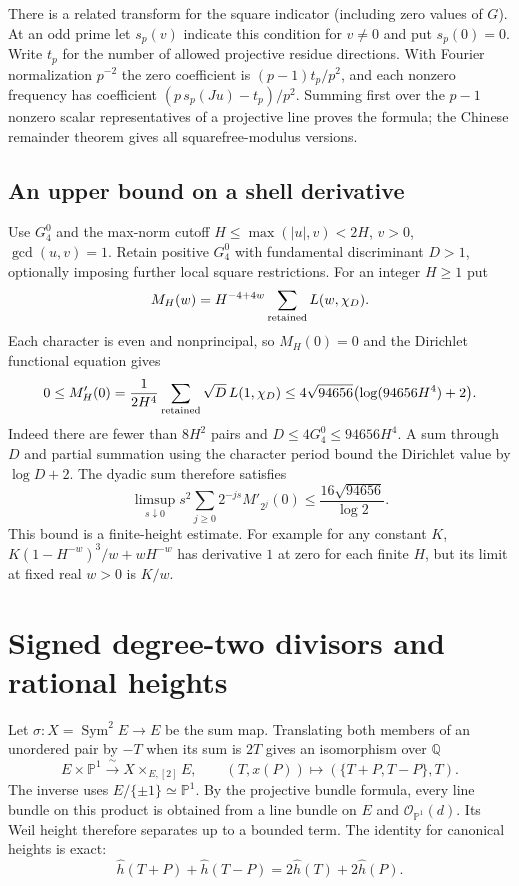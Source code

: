 \documentclass[11pt]{article}
\newcommand{\Q}{\mathbb{Q}}
\begin{document}
There is a related transform for the square indicator (including
zero values of $G$). At an odd prime let $s_p(v)$ indicate this
condition for $v\ne0$ and put $s_p(0)=0$. Write $t_p$ for the number
of allowed projective residue directions. With Fourier normalization
$p^{-2}$ the zero coefficient is $(p-1)t_p/p^2$, and each nonzero
frequency has coefficient $(p\,s_p(Ju)-t_p)/p^2$. Summing first
over the $p-1$ nonzero scalar representatives of a projective line
proves the formula; the Chinese remainder theorem gives all
squarefree-modulus versions.

\subsection{An upper bound on a shell derivative}
Use $G^0_4$ and the max-norm cutoff
$H\le\max(|u|,v)<2H$, $v>0$, $\gcd(u,v)=1$. Retain positive
$G^0_4$ with fundamental discriminant $D>1$, optionally imposing
further local square restrictions. For an integer $H\ge1$ put
\[
 M_H(w)=H^{-4+4w}\sum_{\rm retained}L(w,\chi_D).
\]
Each character is even and nonprincipal, so $M_H(0)=0$ and the
Dirichlet functional equation gives
\[
 0\le M'_H(0)=\frac1{2H^4}\sum_{\rm retained}\sqrt D\,L(1,\chi_D)
 \le4\sqrt{94656}\bigl(\log(94656H^4)+2\bigr).
\]
Indeed there are fewer than $8H^2$ pairs and
$D\le4G_4^0\le94656H^4$. A sum through $D$ and partial summation
using the character period bound the Dirichlet value by $\log D+2$.
The dyadic sum therefore satisfies
\[
 \limsup_{s\downarrow0}s^2\sum_{j\ge0}2^{-js}M'_{2^j}(0)
 \le\frac{16\sqrt{94656}}{\log2}.
\]
This bound is a finite-height estimate. For example for any constant
$K$, $K(1-H^{-w})^3/w+wH^{-w}$ has derivative $1$ at zero for each
finite $H$, but its limit at fixed real $w>0$ is $K/w$.

\section{Signed degree-two divisors and rational heights}
Let $\sigma:X=\operatorname{Sym}^2 E\to E$ be the sum map. Translating
both members of an unordered pair by $-T$ when its sum is $2T$ gives
an isomorphism over $\Q$
\[
 E\times\mathbb P^1\xrightarrow{\ \sim\ } X\times_{E,[2]} E,\qquad
 (T,x(P))\longmapsto(\{T+P,T-P\},T).
\]
The inverse uses $E/\{\pm1\}\simeq\mathbb P^1$. By the projective
bundle formula, every line bundle on this product is obtained from a
line bundle on $E$ and $\mathcal O_{\mathbb P^1}(d)$. Its Weil height
therefore separates up to a bounded term. The identity for canonical
heights is exact:
\[
 \widehat h(T+P)+\widehat h(T-P)=2\widehat h(T)+2\widehat h(P).
\]
\end{document}
